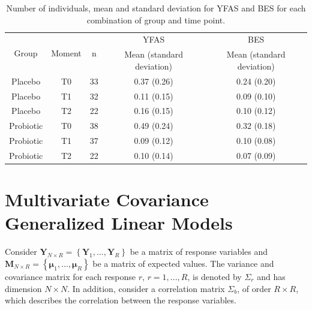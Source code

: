 \documentclass[USenglish]{article}
\theoremstyle{dgthm}
\theoremstyle{dgdef}
\begin{document}
\begin{table}[H]
\centering
\begin{tabular}{ccccc}
\hline
\multirow{2}{*}{Group} & \multirow{2}{*}{Moment}  & \multirow{2}{*}{n} & YFAS                  & BES                   \\ \cline{4-5} 
                       &                          &                    & Mean (standard deviation) & Mean (standard deviation) \\ \hline
Placebo                & T0                       & 33                 & 0.37 (0.26)           & 0.24 (0.20)           \\
Placebo                & T1                       & 32                 & 0.11 (0.15)           & 0.09 (0.10)           \\
Placebo                & T2                       & 22                 & 0.16 (0.15)           & 0.10 (0.12)           \\
Probiotic              & T0                       & 38                 & 0.49 (0.24)           & 0.32 (0.18)           \\
Probiotic              & T1                       & 37                 & 0.09 (0.12)           & 0.10 (0.08)           \\
Probiotic              & T2                       & 22                 & 0.10 (0.14)           & 0.07 (0.09)           \\ \hline
\end{tabular}
\caption{Number of individuals, mean and standard deviation for YFAS and BES for each combination of group and time point.}
\label{tab:tab1}
\end{table}


\section{Multivariate Covariance Generalized Linear Models}\label{sec3}

Consider $\boldsymbol{Y}_{N \times R} = \left \{ \boldsymbol{Y}_1, \dots, \boldsymbol{Y}_R \right \}$ be a matrix of response variables and $\boldsymbol{ M}_{N \times R} = \left \{ \boldsymbol{\mu}_1, \dots, \boldsymbol{\mu}_R \right \}$ be a matrix of expected values. The variance and covariance matrix for each response $r$, $r = 1,..., R$, is denoted by $\Sigma_r$ and has dimension $N \times N$. In addition, consider a correlation matrix $\Sigma_b$, of order $R \times R$, which describes the correlation between the response variables.
\end{document}
